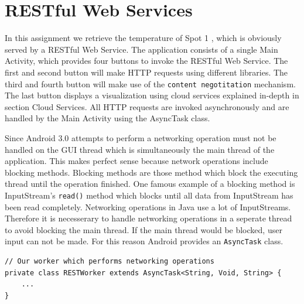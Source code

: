 \documentclass{report}
\begin{document}
\section{RESTful Web Services}
In this assignment we retrieve the temperature of Spot 1 \cite{temperatureSpot1}, which is obviously served by a RESTful Web Service. The application consists of a single Main Activity, which provides four buttons to invoke the RESTful Web Service. The first and second button will make HTTP requests using different libraries. The third and fourth button will make use of the  \texttt{content negotitation} mechanism. The last button displays a visualization using cloud services explained in-depth in section Cloud Services. All HTTP requests are invoked asynchronously and are handled by the Main Activity using the AsyncTask class.

Since Android 3.0 attempts to perform a networking operation must not be handled on the GUI thread which is simultaneously the main thread of the application. This makes perfect sense because network operations include blocking methods. Blocking methods are those method which block the executing thread until the operation finished. One famous example of a blocking method is InputStream's \texttt{read()} method which blocks until all data from InputStream has been read completely. Networking operations in Java use a lot of InputStreams. Therefore it is necesserary to handle networking operations in a seperate thread to avoid blocking the main thread. If the main thread would be blocked, user input can not be made. For this reason Android provides an \texttt{AsyncTask} class.

	\begin{lstlisting}
// Our worker which performs networking operations
private class RESTWorker extends AsyncTask<String, Void, String> {
	...
}
	\end{lstlisting}
\end{document}
